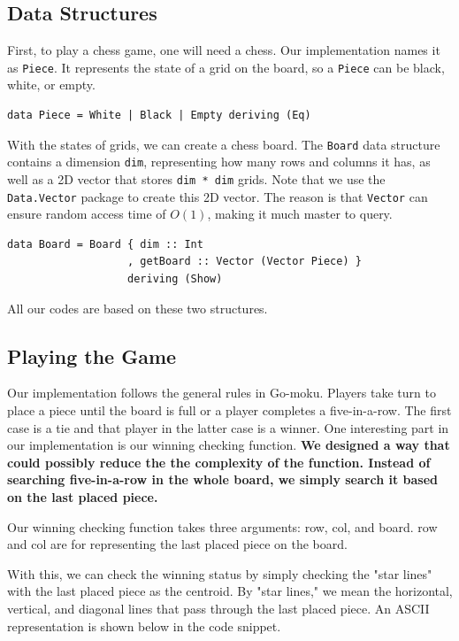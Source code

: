 \documentclass[twoside,11pt]{homework}
\begin{document}
\subsection{Data Structures}
First, to play a chess game, one will need a chess. Our implementation names it as \texttt{Piece}. It represents the state of a grid on the board, so a \texttt{Piece} can be black, white, or empty.
\begin{verbatim}
data Piece = White | Black | Empty deriving (Eq)
\end{verbatim}

With the states of grids, we can create a chess board. The \texttt{Board} data structure contains a dimension \texttt{dim}, representing how many rows and columns it has, as well as a 2D vector that stores \texttt{dim * dim} grids. Note that we use the \texttt{Data.Vector} package to create this 2D vector. The reason is that \texttt{Vector} can ensure random access time of $O(1)$, making it much master to query.
\begin{verbatim}
data Board = Board { dim :: Int
                   , getBoard :: Vector (Vector Piece) }
                   deriving (Show)
\end{verbatim}

All our codes are based on these two structures.

\subsection{Playing the Game}

Our implementation follows the general rules in Go-moku. Players take turn to place a piece until the board is full or a player completes a five-in-a-row. The first case is a tie and that player in the latter case is a winner. One interesting part in our implementation is our winning checking function. \textbf{We designed a way that could possibly reduce the the complexity of the function. Instead of searching five-in-a-row in the whole board, we simply search it based on the last placed piece.}

Our winning checking function takes three arguments: row, col, and board. row and col are for representing the last placed piece on the board.

With this, we can check the winning status by simply checking the "star lines" with the last placed piece as the centroid. By "star lines," we mean the horizontal, vertical, and diagonal lines that pass through the last placed piece. An ASCII representation is shown below in the code snippet.
\end{document}
